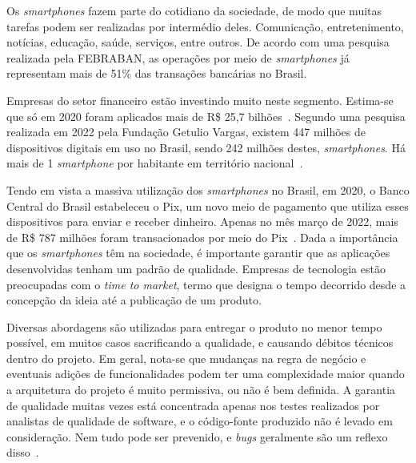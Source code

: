Os \emph{smartphones} fazem parte do cotidiano da sociedade, de modo que muitas tarefas podem ser realizadas por intermédio deles.
Comunicação, entretenimento, notícias, educação, saúde, serviços, entre outros.
De acordo com uma pesquisa realizada pela FEBRABAN, as operações por meio de \emph{smartphones} já representam mais de 51\% das transações bancárias no Brasil.

Empresas do setor financeiro estão investindo muito neste segmento.
Estima-se que só em 2020 foram aplicados mais de R\$ 25,7 bilhões~\cite{febraban-data}.
Segundo uma pesquisa realizada em 2022 pela Fundação Getulio Vargas, existem 447 milhões de dispositivos digitais em uso no Brasil, sendo 242 milhões destes, \emph{smartphones}.
Há mais de 1 \emph{smartphone} por habitante em território nacional~\cite{it-usage-data}.

Tendo em vista a massiva utilização dos \emph{smartphones} no Brasil, em 2020, o Banco Central do Brasil estabeleceu o Pix, um novo meio de pagamento que utiliza esses dispositivos para enviar e receber dinheiro.
Apenas no mês março de 2022, mais de R\$ 787 milhões foram transacionados por meio do Pix~\cite{pix-statistics}.
Dada a importância que os \emph{smartphones} têm na sociedade, é importante garantir que as aplicações desenvolvidas tenham um padrão de qualidade.
Empresas de tecnologia estão preocupadas com o \emph{time to market}, termo que designa o tempo decorrido desde a concepção da ideia até a publicação de um produto.

Diversas abordagens são utilizadas para entregar o produto no menor tempo possível, em muitos casos sacrificando a qualidade, e causando débitos técnicos dentro do projeto.
Em geral, nota-se que mudanças na regra de negócio e eventuais adições de funcionalidades podem ter uma complexidade maior quando a arquitetura do projeto é muito permissiva, ou não é bem definida.
A garantia de qualidade muitas vezes está concentrada apenas nos testes realizados por analistas de qualidade de software, e o código-fonte produzido não é levado em consideração.
Nem tudo pode ser prevenido, e \emph{bugs} geralmente são um reflexo disso~\cite{quality-standards-paper}.